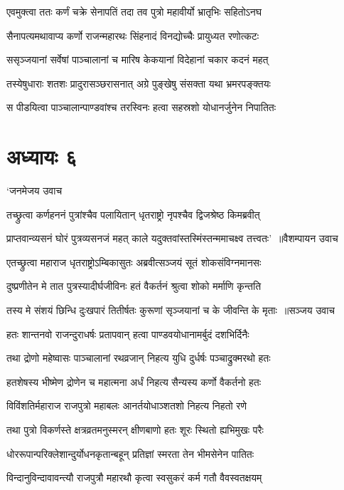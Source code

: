 \twolineshloka
{एवमुक्त्वा ततः कर्णं चक्रे सेनापतिं तदा}
{तव पुत्रो महावीर्यो भ्रातृभिः सहितोऽनघ}


\twolineshloka
{सैनापत्यमथावाप्य कर्णो राजन्महारथः}
{सिंहनादं विनद्योच्चैः प्रायुध्यत रणोत्कटः}


\twolineshloka
{ससृञ्जयानां सर्वेषां पाञ्चालानां च मारिष}
{केकयानां विदेहानां चकार कदनं महत्}


\twolineshloka
{तस्येषुधाराः शतशः प्रादुरासञ्छरासनात्}
{अग्रे पुङ्खेषु संसक्ता यथा भ्रमरपङ्क्तयः}


\twolineshloka
{स पीडयित्वा पाञ्चालान्पाण्डवांश्च तरस्विनः}
{हत्वा सहस्रशो योधानर्जुनेन निपातितः}


\chapter{अध्यायः ६}
\twolineshloka
{`जनमेजय उवाच}
{}


\twolineshloka
{तच्छ्रुत्वा कर्णहननं पुत्रांश्चैव पलायितान्}
{धृतराष्ट्रो नृपश्चैव द्विजश्रेष्ठ किमब्रवीत्}


\threelineshloka
{प्राप्तवान्व्यसनं घोरं पुत्रव्यसनजं महत्}
{काले यदुक्तवांस्तस्मिंस्तन्ममाचक्ष्व तत्त्वतः' ॥वैशम्पायन उवाच}
{}


\twolineshloka
{एतच्छ्रुत्वा महाराज धृतराष्ट्रोऽम्बिकासुतः}
{अब्रवीत्सञ्जयं सूतं शोकसंविग्नमानसः}


\twolineshloka
{दुष्प्रणीतेन मे तात पुत्रस्यादीर्घजीविनः}
{हतं वैकर्तनं श्रुत्वा शोको मर्माणि कृन्तति}


\threelineshloka
{तस्य मे संशयं छिन्धि दुःखपारं तितीर्षतः}
{कुरूणां सृञ्जयानां च के जीवन्ति के मृताः ॥सञ्जय उवाच}
{}


\twolineshloka
{हतः शान्तनवो राजन्दुराधर्षः प्रतापवान्}
{हत्वा पाण्डवयोधानामर्बुदं दशभिर्दिनैः}


\twolineshloka
{तथा द्रोणो महेष्वासः पाञ्चालानां रथव्रजान्}
{निहत्य युधि दुर्धर्षः पञ्चाद्रुक्मरथो हतः}


\twolineshloka
{हतशेषस्य भीष्मेण द्रोणेन च महात्मना}
{अर्धं निहत्य सैन्यस्य कर्णो वैकर्तनो हतः}


\twolineshloka
{विविंशतिर्महाराज राजपुत्रो महाबलः}
{आनर्तयोधाञ्शतशो निहत्य निहतो रणे}


\twolineshloka
{तथा पुत्रो विकर्णस्ते क्षत्रव्रतमनुस्मरन्}
{क्षीणबाणो हतः शूरः स्थितो ह्यभिमुखः परैः}


\twolineshloka
{धोररूपान्परिक्लेशान्दुर्योधनकृतान्बहून्}
{प्रतिज्ञां स्मरता तेन भीमसेनेन पातितः}


\twolineshloka
{विन्दानुविन्दावावन्त्यौ राजपुत्रौ महारथौ}
{कृत्वा स्वसुकरं कर्म गतौ वैवस्वतक्षयम्}


